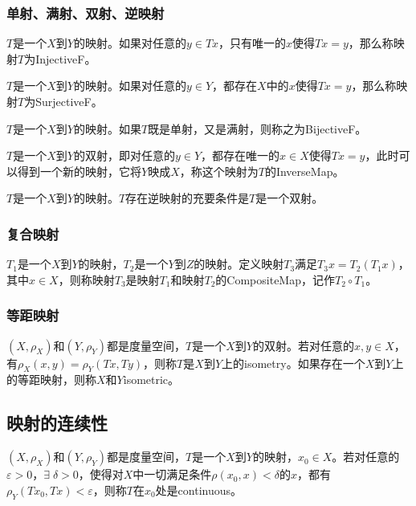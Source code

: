 \subsubsection{单射、满射、双射、逆映射}
\begin{definition}
	$T$是一个$X$到$Y$的映射。如果对任意的$y\in Tx$，只有唯一的$x$使得$Tx=y$，那么称映射$T$为\gls{InjectiveF}。
\end{definition}
\begin{definition}
	$T$是一个$X$到$Y$的映射。如果对任意的$y\in Y$，都存在$X$中的$x$使得$Tx=y$，那么称映射$T$为\gls{SurjectiveF}。
\end{definition}
\begin{definition}
	$T$是一个$X$到$Y$的映射。如果$T$既是单射，又是满射，则称之为\gls{BijectiveF}。
\end{definition}
\begin{definition}
	$T$是一个$X$到$Y$的双射，即对任意的$y\in Y$，都存在唯一的$x\in X$使得$Tx=y$，此时可以得到一个新的映射，它将$Y$映成$X$，称这个映射为$T$的\gls{InverseMap}。
\end{definition}
\begin{theorem}
	$T$是一个$X$到$Y$的映射。$T$存在逆映射的充要条件是$T$是一个双射。
\end{theorem}
\subsubsection{复合映射}
\begin{definition}
	$T_1$是一个$X$到$Y$的映射，$T_2$是一个$Y$到$Z$的映射。定义映射$T_3$满足$T_3x=T_2(T_1x)$，其中$x\in X$，则称映射$T_3$是映射$T_1$和映射$T_2$的\gls{CompositeMap}，记作$T_2\circ T_1$。
\end{definition}
\subsubsection{等距映射}
\begin{definition}
	$(X,\rho_X)$和$(Y,\rho_Y)$都是度量空间，$T$是一个$X$到$Y$的双射。若对任意的$x,y\in X$，有$\rho_X(x,y)=\rho_Y(Tx,Ty)$，则称$T$是$X$到$Y$上的\gls{isometry}。如果存在一个$X$到$Y$上的等距映射，则称$X$和$Y$\gls{isometric}。
\end{definition}
\subsection{映射的连续性}
\begin{definition}
	$(X,\rho_X)$和$(Y,\rho_Y)$都是度量空间，$T$是一个$X$到$Y$的映射，$x_0\in X$。若对任意的$\varepsilon>0$，$\exists\;\delta>0$，使得对$X$中一切满足条件$\rho(x_0,x)<\delta$的$x$，都有$\rho_Y(Tx_0,Tx)<\varepsilon$，则称$T$在$x_0$处是\gls{continuous}。
\end{definition}

